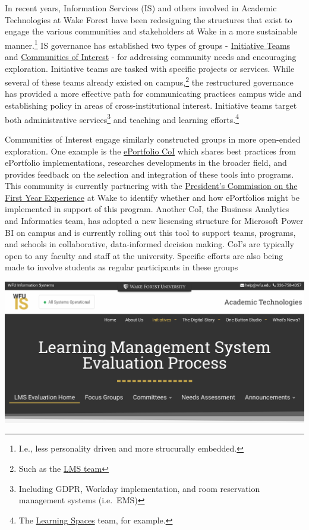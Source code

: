 \documentclass[]{tufte-handout}
\begin{document}
In recent years, Information Services (IS) and others involved in
Academic Technologies at Wake Forest have been redesigning the
structures that exist to engage the various communities and stakeholders
at Wake in a more sustainable manner.\footnote{I.e., less personality
  driven and more strucurally embedded.} IS governance has established
two types of groups -
\href{https://is.wfu.edu/group/initiative-teams/}{Initiative Teams} and
\href{https://is.wfu.edu/group/communities-of-interest/}{Communities of
Interest} - for addressing community needs and encouraging exploration.
Initiative teams are tasked with specific projects or services. While
several of these teams already existed on campus,\footnote{Such as the
  \href{https://is.wfu.edu/governance/learning-management-systems/}{LMS
  team}} the restructured governance has provided a more effective path
for communicating practices campus wide and establishing policy in areas
of cross-institutional interest. Initiative teams target both
administrative services\footnote{Including GDPR, Workday implementation,
  and room reservation management systems (i.e.~EMS)} and teaching and
learning efforts.\footnote{The
  \href{https://is.wfu.edu/governance/learning-spaces/}{Learning Spaces}
  team, for example.}

Communities of Interest engage similarly constructed groups in more
open-ended exploration. One example is the
\href{https://is.wfu.edu/governance/e-portfolio/}{ePortfolio CoI} which
shares best practices from ePortfolio implementations, researches
developments in the broader field, and provides feedback on the
selection and integration of these tools into programs. This community
is currently partnering with the
\href{https://leadershipandcharacter.wfu.edu/what-we-do/current-initiatives/}{President's
Commission on the First Year Experience} at Wake to identify whether and
how ePortfolios might be implemented in support of this program. Another
CoI, the Business Analytics and Informatics team, has adopted a new
licsensing structure for Microsoft Power BI on campus and is currently
rolling out this tool to support teams, programs, and schools in
collaborative, data-informed decision making. CoI's are typically open
to any faculty and staff at the university. Specific efforts are also
being made to involve students as regular participants in these groups

\begin{marginfigure}
\includegraphics[width=33.78in]{images/lms_process} \end{marginfigure}
\end{document}
